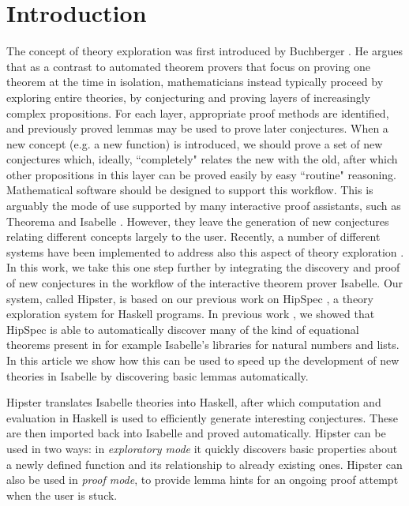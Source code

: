 \section{Introduction}
\label{sec:intro}
The concept of theory exploration was first introduced by Buchberger \cite{buchberger2000theory}. He argues that as a contrast to  automated theorem provers that focus on proving one theorem at the time in isolation, mathematicians instead typically proceed by exploring entire theories, by conjecturing and proving layers of increasingly complex propositions. For each layer, appropriate proof methods are identified, and previously proved lemmas may be used to prove later conjectures. When a new concept (e.g. a new function) is introduced, we should prove a set of new conjectures which, ideally, ``completely" relates the new with the old, after which other propositions in this layer can be proved easily by easy ``routine" reasoning. Mathematical software should be designed to support this workflow. This is arguably the mode of use supported by many interactive proof assistants, such as Theorema \cite{theorema} and Isabelle \cite{isabelle}. However, they leave the generation of new conjectures relating different concepts largely to the user. Recently, a number of different systems have been implemented to address also this aspect of theory exploration \cite{McCasland2006,isacosy,isascheme,hipspecCADE}.  In this work, we take this one step further by integrating the discovery and proof of new conjectures in the workflow of the interactive theorem prover Isabelle. Our system, called Hipster, is based on our previous work on HipSpec \cite{hipspecCADE}, a theory exploration system for Haskell programs. In previous work \cite{hipspecCADE}, we showed that HipSpec is able to automatically discover many of the kind of equational theorems present in for example Isabelle's libraries for natural numbers and lists. In this article we show how this can be used to speed up the development of new theories in Isabelle by discovering basic lemmas automatically. 

Hipster translates Isabelle theories into Haskell, after which computation and evaluation in Haskell is used to efficiently generate interesting conjectures. These are then imported back into Isabelle and proved automatically. Hipster can be used in two ways: in \emph{exploratory mode} it quickly discovers basic properties about a newly defined function and its relationship to already existing ones. Hipster can also be used in \emph{proof mode}, to provide lemma hints for an ongoing proof attempt when the user is stuck. 

